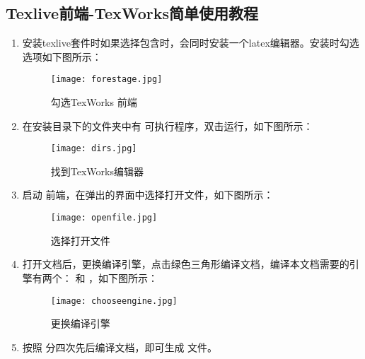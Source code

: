\documentclass{nitthesis}
\begin{document}
\subsection{Texlive前端-TexWorks简单使用教程}

\begin{enumerate}
    \item 安装texlive套件时如果选择包含时，会同时安装一个latex编辑器。安装时勾选选项如下图所示：
    \begin{figure}[H]
        \centering
        \texttt{[image: forestage.jpg]}
        \caption{勾选TexWorks 前端}
    \end{figure}

    \item 在安装目录下的文件夹中有  可执行程序，双击运行，如下图所示：
    \begin{figure}[H]
        \centering
        \texttt{[image: dirs.jpg]}
        \caption{找到TexWorks编辑器}
    \end{figure}
    
    \item 启动  前端，在弹出的界面中选择打开文件，如下图所示：
    \begin{figure}[H]
        \centering
        \texttt{[image: openfile.jpg]}
        \caption{选择打开文件}
    \end{figure}

    \item 打开文档后，更换编译引擎，点击绿色三角形编译文档，编译本文档需要的引擎有两个： 和 ，如下图所示：
    \begin{figure}[H]
        \centering
        \texttt{[image: chooseengine.jpg]}
        \caption{更换编译引擎}
    \end{figure}

    \item 按照  分四次先后编译文档，即可生成  文件。
    
\end{enumerate}





\end{document}
